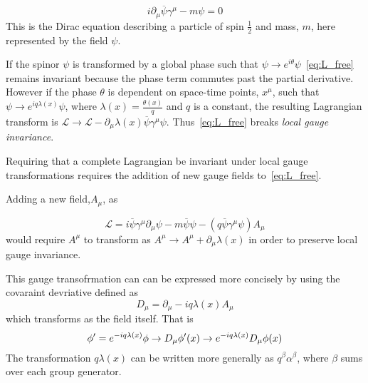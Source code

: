 \begin{equation}
 i\partial_{\mu}\overline{\psi}\gamma^{\mu} -  m\psi = 0
\end{equation}
This is the Dirac equation describing a particle of spin $\frac{1}{2}$ and mass, $m$, here represented by the field $\psi$. 

If the spinor $\psi$ is transformed by a global phase such that $\psi \to e^{i\theta}\psi$~\autoref{eq:L_free} remains invariant because the phase term commutes past the partial derivative. However if the phase $\theta$ is dependent on space-time points, $x^{\mu}$, such that $\psi \to e^{iq\lambda(x)}\psi$, where $\lambda(x) = \frac{\theta(x)}{q}$ and $q$ is a constant, the resulting Lagrangian transform is $\mathcal{L} \to \mathcal{L} - \partial_{\mu}\lambda(x)\overline{\psi}\gamma^{\mu}\psi$. Thus~\autoref{eq:L_free} breaks \emph{local gauge invariance}.

Requiring that a complete Lagrangian be invariant under local gauge transformations requires the addition of new gauge fields to~\autoref{eq:L_free}.

Adding a new field,$A_{\mu}$, as

\begin{equation}
  \label{eq:L_free}
  \mathcal{L} = i\overline{\psi}\gamma^{\mu}\partial_{\mu}\psi - m\overline{\psi}\psi - (q\overline{\psi}\gamma^{\mu}\psi)A_{\mu}
\end{equation}
would require $A^{\mu}$ to transform as $A^{\mu} \to A^{\mu} + \partial_{\mu}\lambda(x)$ in order to preserve local gauge invariance.

This gauge transofrmation can can be expressed more concisely by using the covaraint devriative defined as
\begin{equation}
 D_{\mu} = \partial_{\mu} - iq\lambda(x)A_{\mu}
\end{equation}
which transforms as the field itself.
That is %
\begin{equation}
  \phi^\prime  = e^{-iq\lambda(x)}\phi\\
  \rightarrow D_{\mu}\phi^\prime(x) \to e^{-iq\lambda(x)}D_{\mu}\phi(x)
\end{equation}
The transformation $q\lambda(x)$ can be written more generally as $q^{\beta}\alpha^{\beta}$, where $\beta$ sums over each group generator.

